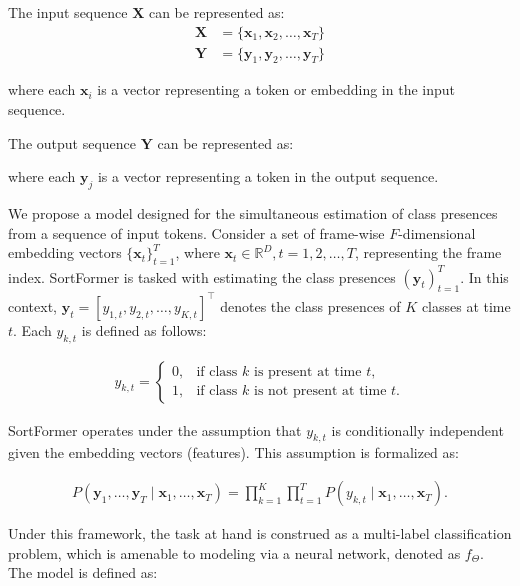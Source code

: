 \documentclass{article}
\begin{document}
The input sequence \( \mathbf{X} \) can be represented as:
\begin{align}
\mathbf{X} & = \{\mathbf{x}_1, \mathbf{x}_2, \ldots, \mathbf{x}_T\} \\
\mathbf{Y} & = \{\mathbf{y}_1, \mathbf{y}_2, \ldots, \mathbf{y}_T\} 
\end{align}

where each \( \mathbf{x}_i \) is a vector representing a token or embedding in the input sequence.

The output sequence \( \mathbf{Y} \) can be represented as:

where each \( \mathbf{y}_j \) is a vector representing a token in the output sequence.

We propose a model designed for the simultaneous estimation of class presences from a sequence of input tokens. Consider a set of frame-wise \( F \)-dimensional embedding vectors $ \{ \mathbf{x}_t \}_{t=1}^T $, where $ \mathbf{x}_t \in \mathbb{R}^D, t = 1, 2, \ldots, T $, representing the frame index. SortFormer is tasked with estimating the class presences \( \left(\mathbf{y}_t\right)_{t=1}^T \). In this context, \( \mathbf{y}_t = \left[y_{1, t}, y_{2, t}, \ldots, y_{K, t}\right]^{\top} \) denotes the class presences of \( K \) classes at time \( t \). Each \( y_{k, t} \) is defined as follows:

\begin{align}
y_{k, t} = \begin{cases} 
0, & \text{if class } k \text{ is present at time } t, \\
1, & \text{if class } k \text{ is not present at time } t.
\end{cases}
\end{align}

SortFormer operates under the assumption that $ y_{k, t} $ is conditionally independent given the embedding vectors (features). This assumption is formalized as:

\begin{align}
P\left(\mathbf{y}_1, \ldots, \mathbf{y}_T \mid \mathbf{x}_1, \ldots, \mathbf{x}_T\right) = \prod_{k=1}^K\prod_{t=1}^T  P\left(y_{k, t} \mid \mathbf{x}_1, \ldots, \mathbf{x}_T\right).
\end{align}

Under this framework, the task at hand is construed as a multi-label classification problem, which is amenable to modeling via a neural network, denoted as  $f_{\Theta}$. The model is defined as:
\end{document}
